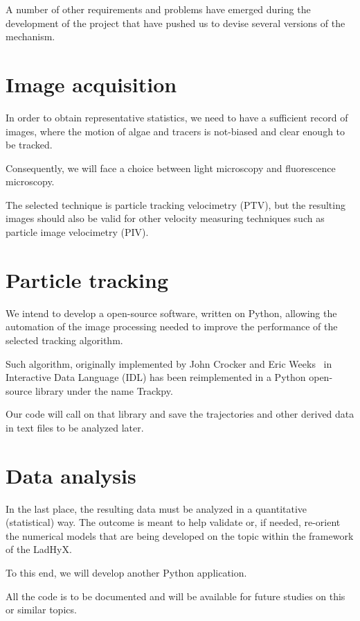 A number of other requirements and problems have emerged during the development of the project that have pushed us to devise several versions of the mechanism.

\section{Image acquisition}

In order to obtain representative statistics, we need to have a sufficient record of images, where the motion of algae and tracers is not-biased and clear enough to be tracked.

Consequently, we will face a choice between light microscopy and fluorescence microscopy.

The selected technique is particle tracking velocimetry (PTV), but the resulting images should also be valid for other velocity measuring techniques such as particle image velocimetry (PIV).

\section{Particle tracking}

We intend to develop a open-source software, written on Python, allowing the automation of the image processing needed to improve the performance of the selected tracking algorithm.

Such algorithm, originally implemented by John Crocker and Eric Weeks~\cite{Crocker} in Interactive Data Language (IDL) has been reimplemented in a Python open-source library under the name Trackpy.

Our code will call on that library and save the trajectories and other derived data in text files to be analyzed later. 

\section{Data analysis}

In the last place, the resulting data must be analyzed in a quantitative (statistical) way. The outcome is meant to help validate or, if needed, re-orient the numerical models that are being developed on the topic within the framework of the LadHyX.

To this end, we will develop another Python application.

All the code is to be documented and will be available for future studies on this or similar topics.

